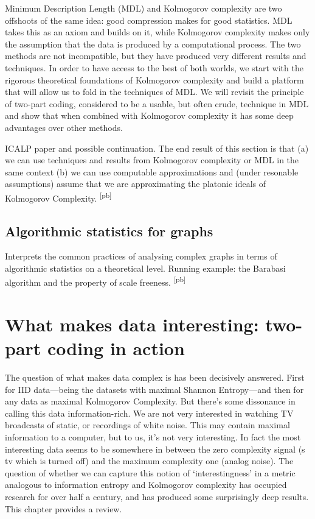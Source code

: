 \documentclass{thesis}
\newcommand{\pb}[1]{\textcolor{OliveGreen}{\small #1 \textsuperscript{[pb]} }}
\begin{document}
\begin{summary}Minimum Description Length (MDL) and Kolmogorov complexity are two offshoots of the same idea: good compression makes for good statistics. MDL takes this as an axiom and builds on it, while Kolmogorov complexity makes only the assumption that the data is produced by a computational process. The two methods are not incompatible, but they have produced very different results and techniques. In order to have access to the best of both worlds, we start with the rigorous theoretical foundations of Kolmogorov complexity and build a platform that will allow us to fold in the techniques of MDL. We will revisit the principle of two-part coding, considered to be a usable, but often crude, technique in MDL and show that when combined with Kolmogorov complexity it has some deep advantages over other methods.
\end{summary}

\pb{ICALP paper and possible continuation. The end result of this section is that (a) we can use techniques and results from Kolmogorov complexity or MDL in the same context (b) we can use computable approximations and (under resonable assumptions) assume that we are approximating the platonic ideals of Kolmogorov Complexity.}

\section{Algorithmic statistics for graphs}

\pb{Interprets the common practices of analysing complex graphs in terms of algorithmic statistics on a theoretical level. Running example: the Barabasi algorithm and the property of scale freeness.} 

\chapter{What makes data interesting: two-part coding in action}

\begin{summary}The question of what makes data complex is has been decisively answered. First for IID data---being the datasets with maximal Shannon Entropy---and then for any data as maximal Kolmogorov Complexity. But there's some dissonance in calling this data information-rich. We are not very interested in watching TV broadcasts of static, or recordings of white noise. This may contain maximal information to a computer, but to us, it's not very interesting. In fact the most interesting data seems to be somewhere in between the zero complexity signal (s tv which is turned off) and the maximum complexity one (analog noise). The question of whether we can capture this notion of `interestingness' in a metric analogous to information entropy and Kolmogorov complexity has occupied research for over half a century, and has produced some surprisingly deep results. This chapter provides a review.
\end{summary}
\end{document}
